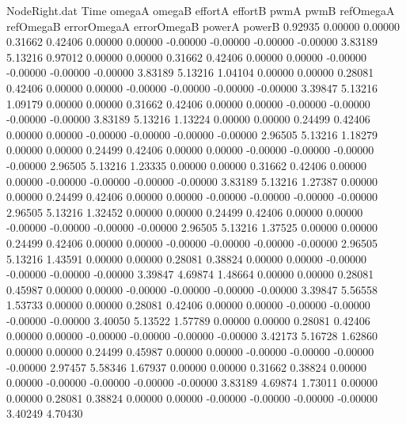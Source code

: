 \begin{filecontents}{NodeRight.dat}
Time omegaA omegaB effortA effortB pwmA pwmB refOmegaA refOmegaB errorOmegaA errorOmegaB powerA powerB
   0.92935    0.00000    0.00000     0.31662    0.42406    0.00000    0.00000   -0.00000   -0.00000   -0.00000   -0.00000    3.83189    5.13216
   0.97012    0.00000    0.00000     0.31662    0.42406    0.00000    0.00000   -0.00000   -0.00000   -0.00000   -0.00000    3.83189    5.13216
   1.04104    0.00000    0.00000     0.28081    0.42406    0.00000    0.00000   -0.00000   -0.00000   -0.00000   -0.00000    3.39847    5.13216
   1.09179    0.00000    0.00000     0.31662    0.42406    0.00000    0.00000   -0.00000   -0.00000   -0.00000   -0.00000    3.83189    5.13216
   1.13224    0.00000    0.00000     0.24499    0.42406    0.00000    0.00000   -0.00000   -0.00000   -0.00000   -0.00000    2.96505    5.13216
   1.18279    0.00000    0.00000     0.24499    0.42406    0.00000    0.00000   -0.00000   -0.00000   -0.00000   -0.00000    2.96505    5.13216
   1.23335    0.00000    0.00000     0.31662    0.42406    0.00000    0.00000   -0.00000   -0.00000   -0.00000   -0.00000    3.83189    5.13216
   1.27387    0.00000    0.00000     0.24499    0.42406    0.00000    0.00000   -0.00000   -0.00000   -0.00000   -0.00000    2.96505    5.13216
   1.32452    0.00000    0.00000     0.24499    0.42406    0.00000    0.00000   -0.00000   -0.00000   -0.00000   -0.00000    2.96505    5.13216
   1.37525    0.00000    0.00000     0.24499    0.42406    0.00000    0.00000   -0.00000   -0.00000   -0.00000   -0.00000    2.96505    5.13216
   1.43591    0.00000    0.00000     0.28081    0.38824    0.00000    0.00000   -0.00000   -0.00000   -0.00000   -0.00000    3.39847    4.69874
   1.48664    0.00000    0.00000     0.28081    0.45987    0.00000    0.00000   -0.00000   -0.00000   -0.00000   -0.00000    3.39847    5.56558
   1.53733    0.00000    0.00000     0.28081    0.42406    0.00000    0.00000   -0.00000   -0.00000   -0.00000   -0.00000    3.40050    5.13522
   1.57789    0.00000    0.00000     0.28081    0.42406    0.00000    0.00000   -0.00000   -0.00000   -0.00000   -0.00000    3.42173    5.16728
   1.62860    0.00000    0.00000     0.24499    0.45987    0.00000    0.00000   -0.00000   -0.00000   -0.00000   -0.00000    2.97457    5.58346
   1.67937    0.00000    0.00000     0.31662    0.38824    0.00000    0.00000   -0.00000   -0.00000   -0.00000   -0.00000    3.83189    4.69874
   1.73011    0.00000    0.00000     0.28081    0.38824    0.00000    0.00000   -0.00000   -0.00000   -0.00000   -0.00000    3.40249    4.70430

\end{filecontents}
